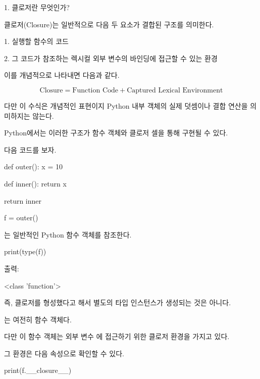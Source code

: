 \begin{dhknote}
\begin{dhksmry}[centered]
1. 클로저란 무엇인가?
\end{dhksmry}
\end{dhknote}

클로저(Closure)는 일반적으로 다음 두 요소가 결합된 구조를 의미한다.

\begin{dhksmry}
1. 실행할 함수의 코드

2. 그 코드가 참조하는 렉시컬 외부 변수의 바인딩에 접근할 수 있는 환경
\end{dhksmry}

이를 개념적으로 나타내면 다음과 같다.

\[
\text{Closure}
=
\text{Function Code}
+
\text{Captured Lexical Environment}
\]

다만 이 수식은 개념적인 표현이지 Python 내부 객체의 실제 덧셈이나 결합 연산을 의미하지는 않는다.

Python에서는 이러한 구조가 함수 객체와 클로저 셀을 통해 구현될 수 있다.

다음 코드를 보자.

\begin{dhkcode}
def outer():
    x = 10

    def inner():
        return x

    return inner


f = outer()
\end{dhkcode}

는 일반적인 Python 함수 객체를 참조한다.

\begin{dhkcode}
print(type(f))
\end{dhkcode}

출력:

\begin{dhkzsh}
<class 'function'>
\end{dhkzsh}

즉, 클로저를 형성했다고 해서 별도의  타입 인스턴스가 생성되는 것은 아니다.

는 여전히 함수 객체다.

다만 이 함수 객체는 외부 변수 에 접근하기 위한 클로저 환경을 가지고 있다.

그 환경은 다음 속성으로 확인할 수 있다.

\begin{dhkcode}
print(f.__closure__)
\end{dhkcode}

